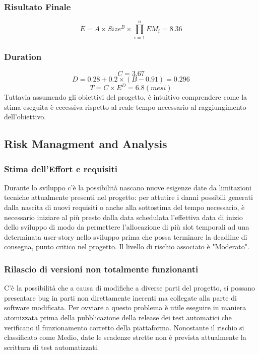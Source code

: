 \documentclass[11pt]{article}
\begin{document}
\subsubsection{Risultato Finale}
   \[ E = A \times Size^B \times \prod_{i=1}^{n} EM_i = 8.36 \]
\subsubsection{Duration}
   \[ C = 3.67 \]
   \[ D = 0.28 + 0.2 \times (B - 0.91) = 0.296 \]
   \[ T = C \times E^D = 6.8 (mesi) \]
   Tuttavia assumendo gli obiettivi del progetto, è intuitivo comprendere come la stima eseguita è eccessiva rispetto al reale tempo necessario al raggiungimento dell'obiettivo.
\subsection{Risk Managment and Analysis}
\subsubsection{Stima dell'Effort e requisiti}
Durante lo sviluppo c'è la possibilità nascano nuove esigenze date da limitazioni tecniche attualmente presenti nel progetto: per attutire i danni possibili generati dalla nascita di nuovi requisiti o anche alla sottostima del tempo necessario, è necessario iniziare al più presto dalla data schedulata l'effettiva data di inizio dello sviluppo di modo da permettere l'allocazione di più slot temporali ad una determinata user-story nello sviluppo prima che possa terminare la deadline di consegna, punto critico nel progetto. Il livello di rischio associato è "Moderato".
\subsubsection{Rilascio di versioni non totalmente funzionanti}
C'è la possibilità che a causa di modifiche a diverse parti del progetto, si possano presentare bug in parti non direttamente inerenti ma collegate alla parte di software modificata. Per ovviare a questo problema è utile eseguire in maniera atomizzata prima della pubblicazione della release dei test automatici che verificano il funzionamento corretto della piattaforma. Nonostante il rischio si classificato come Medio, date le scadenze strette non è prevista attualmente la scrittura di test automatizzati.
\end{document}

